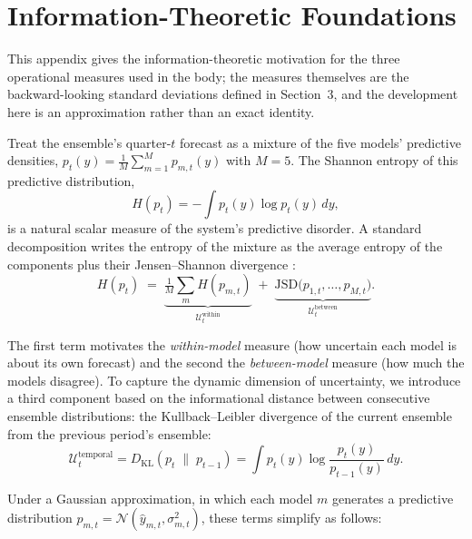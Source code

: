 \documentclass[12pt,a4paper]{article}
\theoremstyle{remark}
\begin{document}
\newpage
\appendix

\section{Information-Theoretic Foundations}
\label{sec:appendix_foundations}

This appendix gives the information-theoretic motivation for the three operational measures used in the body; the measures themselves are the backward-looking standard deviations defined in Section~3, and the development here is an approximation rather than an exact identity.

Treat the ensemble's quarter-$t$ forecast as a mixture of the five models' predictive densities, $p_t(y) = \tfrac{1}{M}\sum_{m=1}^{M} p_{m,t}(y)$ with $M = 5$. The Shannon entropy of this predictive distribution,
\begin{equation}
H(p_t) = -\int p_t(y)\log p_t(y)\,dy,
\end{equation}
is a natural scalar measure of the system's predictive disorder. A standard decomposition writes the entropy of the mixture as the average entropy of the components plus their Jensen--Shannon divergence \citep{haussler1997,heskes1998}:
\begin{equation}
H(p_t) \;=\; \underbrace{\tfrac{1}{M}\sum_{m} H(p_{m,t})}_{\mathcal{U}^{\text{within}}_t}
\;+\; \underbrace{\mathrm{JSD}\big(p_{1,t},\dots,p_{M,t}\big)}_{\mathcal{U}^{\text{between}}_t} .
\label{eq:decomposition_theory}
\end{equation}

The first term motivates the \emph{within-model} measure (how uncertain each model is about its own forecast) and the second the \emph{between-model} measure (how much the models disagree). To capture the dynamic dimension of uncertainty, we introduce a third component based on the informational distance between consecutive ensemble distributions: the Kullback--Leibler divergence of the current ensemble from the previous period's ensemble:
\begin{equation}
\mathcal{U}^{\text{temporal}}_t = D_{\text{KL}}(p_t \;\|\; p_{t-1}) = \int p_t(y) \log \frac{p_t(y)}{p_{t-1}(y)}\, dy .
\end{equation}

Under a Gaussian approximation, in which each model $m$ generates a predictive distribution $p_{m,t} = \mathcal{N}(\hat{y}_{m,t}, \sigma_{m,t}^2)$, these terms simplify as follows:
\end{document}
